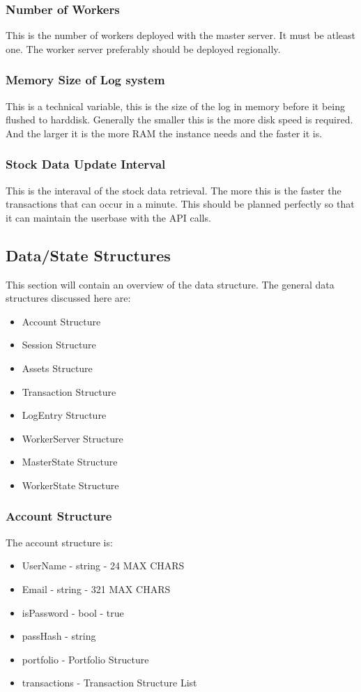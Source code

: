 \documentclass[a4paper]{article}
\begin{document}
\subsubsection{Number of Workers}
\label{var_num_worker}
This is the number of workers deployed with the master server. It must be 
atleast one. The worker server preferably should be deployed regionally.
\subsubsection{Memory Size of Log system}
\label{var_log_size}
This is a technical variable, this is the size of the log in memory before it 
being flushed to harddisk. Generally the smaller this is the more disk speed is
required. And the larger it is the more RAM the instance needs and the faster 
it is.
\subsubsection{Stock Data Update Interval}
\label{var_data_update_interval}
This is the interaval of the stock data retrieval. The more this is the faster
the transactions that can occur in a minute. This should be planned perfectly
so that it can maintain the userbase with the API calls.

\subsection{Data/State Structures}
\label{ds_list}
This section will contain an overview of the data structure. The general data
structures discussed here are:
\begin{itemize}
	\item Account Structure
	\item Session Structure
	\item Assets Structure
	\item Transaction Structure
	\item LogEntry Structure
	\item WorkerServer Structure
	\item MasterState Structure
	\item WorkerState Structure
\end{itemize}

\subsubsection{Account Structure}
\label{ds_account}
The account structure is:
\begin{itemize}
	\item UserName - string - 24 MAX CHARS
	\item Email - string - 321 MAX CHARS
	\item isPassword - bool - true
	\item passHash - string
	\item portfolio - Portfolio Structure
	\item transactions - Transaction Structure List
\end{itemize}
\end{document}
